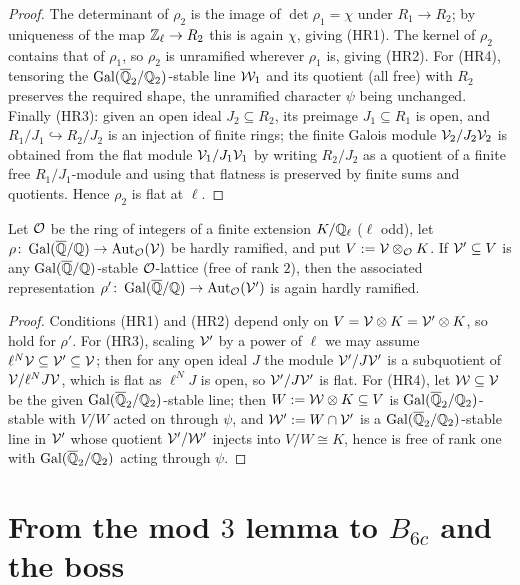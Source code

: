 \documentclass[11pt]{article}
\begin{document}
\begin{proof}
The determinant of $\rho_2$ is the image of $\det\rho_1=\chi$ under
$R_1\to R_2$; by uniqueness of the map $\mathbb{Z}_\ell\to R_2$ this is again $\chi$, giving
(HR1). The kernel of $\rho_2$ contains that of $\rho_1$, so $\rho_2$ is
unramified wherever $\rho_1$ is, giving (HR2). For (HR4), tensoring the
$\operatorname{Gal}(\overline{\mathbb{Q}}_2/\mathbb{Q}_2)$-stable line $\mathcal{W}_1$ and its quotient (all free) with
$R_2$ preserves the required shape, the unramified character $\psi$ being
unchanged. Finally (HR3): given an open ideal $J_2\subseteq R_2$, its preimage
$J_1\subseteq R_1$ is open, and $R_1/J_1\hookrightarrow R_2/J_2$ is an injection
of finite rings; the finite Galois module $\mathcal{V}_2/J_2\mathcal{V}_2$ is obtained from
the flat module $\mathcal{V}_1/J_1\mathcal{V}_1$ by writing $R_2/J_2$ as a quotient of a
finite free $R_1/J_1$-module and using that flatness is preserved by finite
sums and quotients. Hence $\rho_2$ is flat at $\ell$.
\end{proof}

\begin{proposition}\label{prop:lattice}
Let $\mathcal{O}$ be the ring of integers of a finite extension $K/\mathbb{Q}_\ell$ ($\ell$
odd), let $\rho\colon\operatorname{Gal}(\overline{\mathbb{Q}}/\mathbb{Q})\to\operatorname{Aut}_{\mathcal{O}}(\mathcal{V})$ be hardly ramified, and put
$V:=\mathcal{V}\otimes_{\mathcal{O}} K$. If $\mathcal{V}'\subseteq V$ is any $\operatorname{Gal}(\overline{\mathbb{Q}}/\mathbb{Q})$-stable
$\mathcal{O}$-lattice \textup{(}free of rank $2$\textup{)}, then the associated
representation $\rho'\colon\operatorname{Gal}(\overline{\mathbb{Q}}/\mathbb{Q})\to\operatorname{Aut}_{\mathcal{O}}(\mathcal{V}')$ is again hardly ramified.
\end{proposition}

\begin{proof}
Conditions (HR1) and (HR2) depend only on $V=\mathcal{V}\otimes K=\mathcal{V}'\otimes K$, so
hold for $\rho'$. For (HR3), scaling $\mathcal{V}'$ by a power of $\ell$ we may assume
$\ell^N\mathcal{V}\subseteq\mathcal{V}'\subseteq\mathcal{V}$; then for any open ideal $J$ the
module $\mathcal{V}'/J\mathcal{V}'$ is a subquotient of $\mathcal{V}/\ell^N J\mathcal{V}$, which is
flat as $\ell^N J$ is open, so $\mathcal{V}'/J\mathcal{V}'$ is flat. For (HR4), let
$\mathcal{W}\subseteq\mathcal{V}$ be the given $\operatorname{Gal}(\overline{\mathbb{Q}}_2/\mathbb{Q}_2)$-stable line; then
$W:=\mathcal{W}\otimes K\subseteq V$ is $\operatorname{Gal}(\overline{\mathbb{Q}}_2/\mathbb{Q}_2)$-stable with $V/W$ acted on
through $\psi$, and $\mathcal{W}':=W\cap\mathcal{V}'$ is a $\operatorname{Gal}(\overline{\mathbb{Q}}_2/\mathbb{Q}_2)$-stable line
in $\mathcal{V}'$ whose quotient $\mathcal{V}'/\mathcal{W}'$ injects into $V/W\cong K$, hence is
free of rank one with $\operatorname{Gal}(\overline{\mathbb{Q}}_2/\mathbb{Q}_2)$ acting through $\psi$.
\end{proof}

\section{From the mod $3$ lemma to $B_{6c}$ and the boss}
\end{document}
